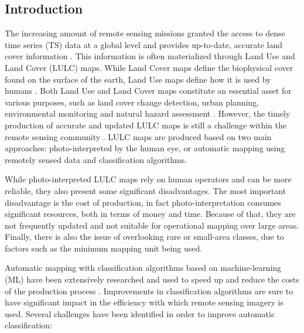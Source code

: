 \documentclass[authoryear,preprint,12pt]{elsarticle}
\begin{document}
\begin{linenumbers}

\section{Introduction}

The increasing amount of remote sensing missions granted the access to dense
time series (TS) data at a global level and provides up-to-date, accurate land
cover information \citep{Drusch2012}. This information is often materialized
through Land Use and Land Cover (LULC) maps. While Land Cover maps
define the biophysical cover found on the surface of the earth, Land Use maps
define how it is used by humans \citep{Fritz2017}. Both Land Use and Land Cover
maps constitute an essential asset for various purposes, such as land cover
change detection, urban planning, environmental monitoring and natural hazard
assessment \citep{Khatami2016}. However, the timely production of accurate and
updated LULC maps is still a challenge within the remote sensing community
\citep{Wulder2018}. LULC maps are produced based on two main approaches:
photo-interpreted by the human eye, or automatic mapping using remotely sensed
data and classification algorithms.

While photo-interpreted LULC maps rely on human operators and can be more
reliable, they also present some significant disadvantages. The most important
disadvantage is the cost of production, in fact photo-interpretation consumes
significant resources, both in terms of money and time. Because of that, they
are not frequently updated and not suitable for operational mapping over large
areas.  Finally, there is also the issue of overlooking rare or small-area
classes, due to factors such as the minimum mapping unit being used.

Automatic mapping with classification algorithms based on machine-learning
(ML) have been extensively researched and used to speed up and reduce the
costs of the production process \citep{Khatami2016, Gavade2019,
Kaur2019}. Improvements in classification algorithms are sure to have
significant impact in the efficiency with which remote sensing imagery is
used. Several challenges have been identified in order to improve automatic
classification:


\end{linenumbers}
\end{document}
